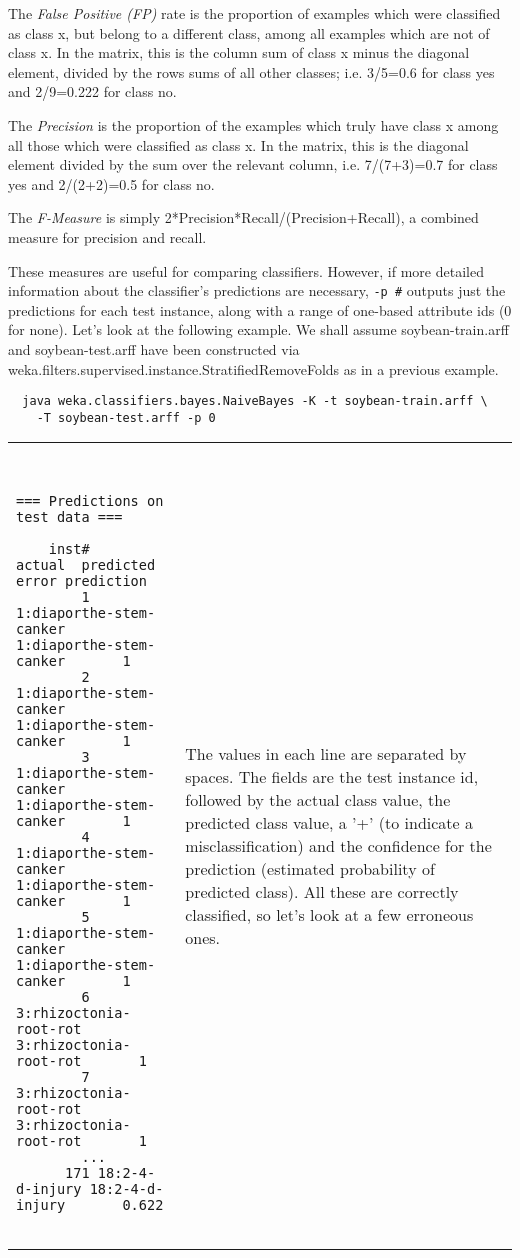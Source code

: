 The \textit{False Positive (FP)} rate is the proportion of examples which were classified as class x, but belong to a different class, among all examples which are not of class x. In the matrix, this is the column sum of class x minus the diagonal element, divided by the rows sums of all other classes; i.e. 3/5=0.6 for class yes and 2/9=0.222 for class no.

The \textit{Precision} is the proportion of the examples which truly have class x among all those which were classified as class x. In the matrix, this is the diagonal element divided by the sum over the relevant column, i.e. 7/(7+3)=0.7 for class yes and 2/(2+2)=0.5 for class no.

The \textit{F-Measure} is simply 2*Precision*Recall/(Precision+Recall), a combined measure for precision and recall.

These measures are useful for comparing classifiers. However, if more detailed information about the classifier's predictions are necessary, \texttt{-p \#} outputs just the predictions for each test instance, along with a range of one-based attribute ids (0 for none). Let's look at the following example. We shall assume soybean-train.arff and soybean-test.arff have been constructed via weka.filters.supervised.instance.StratifiedRemoveFolds as in a previous example.

{\scriptsize
\begin{verbatim}
  java weka.classifiers.bayes.NaiveBayes -K -t soybean-train.arff \
    -T soybean-test.arff -p 0
\end{verbatim}}

\vspace{0.5cm}
\noindent
\begin{tabular}{l l}
	\begin{minipage}{8cm}
		{\scriptsize
		\begin{verbatim}


=== Predictions on test data ===

    inst#     actual  predicted error prediction
        1 1:diaporthe-stem-canker 1:diaporthe-stem-canker       1 
        2 1:diaporthe-stem-canker 1:diaporthe-stem-canker       1 
        3 1:diaporthe-stem-canker 1:diaporthe-stem-canker       1 
        4 1:diaporthe-stem-canker 1:diaporthe-stem-canker       1 
        5 1:diaporthe-stem-canker 1:diaporthe-stem-canker       1 
        6 3:rhizoctonia-root-rot 3:rhizoctonia-root-rot       1 
        7 3:rhizoctonia-root-rot 3:rhizoctonia-root-rot       1 
        ...      
      171 18:2-4-d-injury 18:2-4-d-injury       0.622 


		\end{verbatim}}
	\end{minipage}
	&
	\begin{minipage}{5cm}
	The values in each line are separated by spaces. The fields are the test instance id, followed by the actual class value, the predicted class value, a '+' (to indicate a misclassification) and the confidence for the prediction (estimated probability of predicted class). All these are correctly classified, so let's look at a few erroneous ones.
	\end{minipage}
	\\
\end{tabular}

